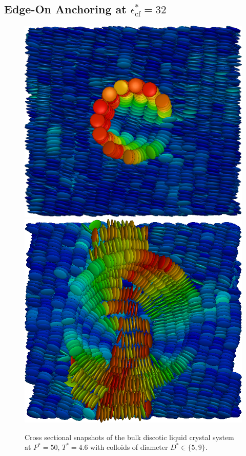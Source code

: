 \subsection{Edge-On Anchoring at $\epsilon_{\text{cf}}^*= 32$}

\begin{figure}[H]
 \centering
 \includegraphics[width=.4\linewidth]{images/beo_C32_D5.png}
 \qquad
 \includegraphics[width=.4\linewidth]{images/beo_C32_D9.png}
\caption{Cross sectional snapshots of the bulk discotic liquid crystal system at $P^* = 50$, $T^* = 4.6$ with colloids of diameter $D^* \in \{5,9\} $.}
 \label{fig:beosnapshots}
\end{figure}


